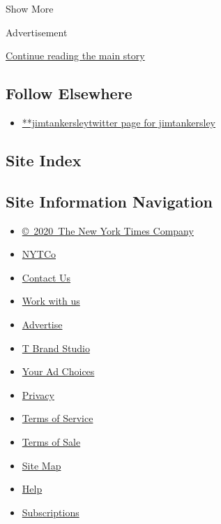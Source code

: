 Show More

Advertisement

\protect\hyperlink{after-mid2}{Continue reading the main story}

\hypertarget{follow-elsewhere}{%
\subsection{Follow Elsewhere}\label{follow-elsewhere}}

\begin{itemize}
\tightlist
\item
  \href{https://twitter.com/jimtankersley}{**jimtankersleytwitter page
  for jimtankersley}
\end{itemize}

\hypertarget{site-index}{%
\subsection{Site Index}\label{site-index}}

\hypertarget{site-information-navigation}{%
\subsection{Site Information
Navigation}\label{site-information-navigation}}

\begin{itemize}
\tightlist
\item
  \href{https://help.nytimes3xbfgragh.onion/hc/en-us/articles/115014792127-Copyright-notice}{©~2020~The
  New York Times Company}
\end{itemize}

\begin{itemize}
\tightlist
\item
  \href{https://www.nytco.com/}{NYTCo}
\item
  \href{https://help.nytimes3xbfgragh.onion/hc/en-us/articles/115015385887-Contact-Us}{Contact
  Us}
\item
  \href{https://www.nytco.com/careers/}{Work with us}
\item
  \href{https://nytmediakit.com/}{Advertise}
\item
  \href{http://www.tbrandstudio.com/}{T Brand Studio}
\item
  \href{https://www.nytimes3xbfgragh.onion/privacy/cookie-policy\#how-do-i-manage-trackers}{Your
  Ad Choices}
\item
  \href{https://www.nytimes3xbfgragh.onion/privacy}{Privacy}
\item
  \href{https://help.nytimes3xbfgragh.onion/hc/en-us/articles/115014893428-Terms-of-service}{Terms
  of Service}
\item
  \href{https://help.nytimes3xbfgragh.onion/hc/en-us/articles/115014893968-Terms-of-sale}{Terms
  of Sale}
\item
  \href{https://spiderbites.nytimes3xbfgragh.onion}{Site Map}
\item
  \href{https://help.nytimes3xbfgragh.onion/hc/en-us}{Help}
\item
  \href{https://www.nytimes3xbfgragh.onion/subscription?campaignId=37WXW}{Subscriptions}
\end{itemize}
